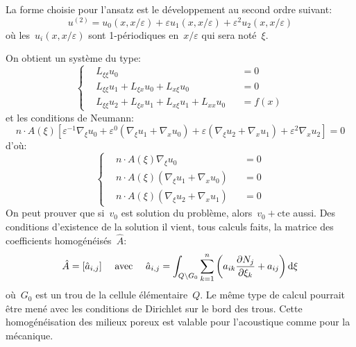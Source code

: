 \medskip
{}

La forme choisie pour l'ansatz est le développement au second ordre suivant:
\begin{equation}u^{(2)} = u_0(x,x/\varepsilon)+\varepsilon u_1(x,x/\varepsilon) + \varepsilon^2 u_2(x,x/\varepsilon)\end{equation}
où les~$u_i(x,x/\varepsilon)$ sont 1-périodiques en~$x/\varepsilon$ qui sera noté~$\xi$.

On obtient un système du type:
\begin{equation}\left\{
\begin{aligned}
&L_{\xi\xi} u_0 &&=0\\
&L_{\xi\xi}u_1+L_{\xi x}u_0+L_{x\xi}u_0 &&=0\\
&L_{\xi\xi}u_2+L_{\xi x}u_1+L_{x\xi}u_1 +L_{xx}u_0 &&=f(x)
\end{aligned}
\right. \end{equation}
et les conditions de Neumann:
\begin{equation} n\cdot A(\xi)\left[ \varepsilon^{-1}\nabla_\xi u_0 + \varepsilon^0 (\nabla_\xi u_1+\nabla_x u_0) +
\varepsilon(\nabla_\xi u_2+\nabla_x u_1)+\varepsilon^2\nabla_x u_2
\right]=0 \end{equation}
d'où:
\begin{equation}\left\{
\begin{aligned}
&n\cdot A(\xi)\nabla_\xi u_0 &&=0\\
&n\cdot A(\xi) (\nabla_\xi u_1+\nabla_x u_0) &&=0\\
&n\cdot A(\xi)(\nabla_\xi u_2+\nabla_x u_1) &&=0
\end{aligned}
\right. \end{equation}
On peut prouver que si~$v_0$ est solution du problème, alors~$v_0+\text{cte}$ aussi.
\medskipvm
Des conditions d'existence de la solution il vient, tous calculs faits, la matrice des
coefficients homogénéisés~$\hat{A}$:
\begin{equation} \hat{A} = [\hat{a}_{i,j} ]
\quad \text{ avec }
\quad
\hat{a}_{i,j}=\displaystyle\int_{Q\backslash G_0} \displaystyle\sum_{k=1}^n \left(a_{ik} \frac{\partial N_j}{\partial\xi_k} + a_{ij}
\right) \text{d}\xi
\end{equation}
où~$G_0$ est un trou de la cellule élémentaire~$Q$.
\medskipvm
Le même type de calcul pourrait être mené avec les conditions de Dirichlet sur le bord des trous.
\medskipvm
Cette homogénéisation des milieux poreux est valable pour l'acoustique comme pour la mécanique.

